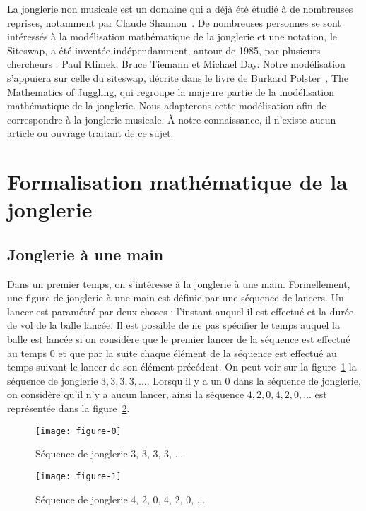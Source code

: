 \documentclass[a4paper]{easychair}
\begin{document}
La jonglerie non musicale est un domaine qui a déjà été étudié à de nombreuses
reprises, notamment par Claude Shannon~\cite{shannon}. De nombreuses personnes
se sont intéressés à la modélisation mathématique de la jonglerie et une
notation, le Siteswap, a été inventée indépendamment, autour de 1985, par
plusieurs chercheurs : Paul Klimek, Bruce Tiemann et Michael Day. Notre
modélisation s'appuiera sur celle du siteswap, décrite dans le livre de Burkard
Polster~\cite{polster}, The Mathematics of Juggling, qui regroupe la majeure
partie de la modélisation mathématique de la jonglerie. Nous adapterons cette
modélisation afin de correspondre à la jonglerie musicale. À notre connaissance,
il n'existe aucun article ou ouvrage traitant de ce sujet.

\section{Formalisation mathématique de la jonglerie}
\subsection{Jonglerie à une main}
Dans un premier temps, on s'intéresse à la jonglerie à une main. Formellement,
une figure de jonglerie à une main est définie par une séquence de lancers. Un
lancer est paramétré par deux choses : l'instant auquel il est effectué et la
durée de vol de la balle lancée. Il est possible de ne pas spécifier le temps
auquel la balle est lancée si on considère que le premier lancer de la séquence
est effectué au temps $0$ et que par la suite chaque élément de la séquence est
effectué au temps suivant le lancer de son élément précédent. On peut voir sur
la figure~\ref{fig1} la séquence de jonglerie $3, 3, 3, 3, ...$. Lorsqu'il y a
un $0$ dans la séquence de jonglerie, on considère qu'il n'y a aucun lancer,
ainsi la séquence $4, 2, 0, 4, 2, 0, ...$ est représentée dans la
figure~\ref{fig2}.

\begin{figure}[!h]
  \centering
  \texttt{[image: figure-0]}

  \caption{Séquence de jonglerie 3, 3, 3, 3, ...}
  \label{fig1}
\end{figure}

\begin{figure}[!h]
  \centering
  \texttt{[image: figure-1]}

  \caption{Séquence de jonglerie 4, 2, 0, 4, 2, 0, ...}
  \label{fig2}
\end{figure}
\end{document}
